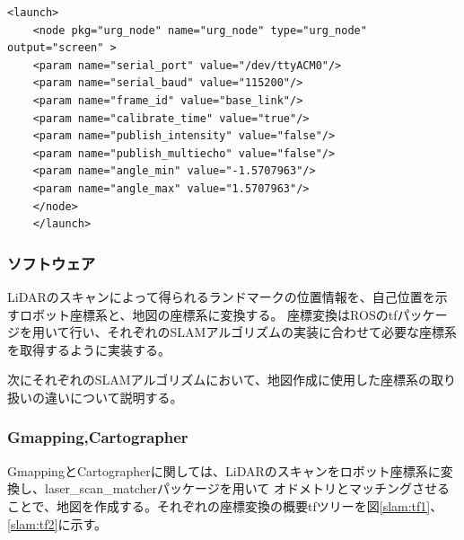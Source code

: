 \begin{lrbox}{\mybox}
  \begin{lstlisting}[caption=LiDARによる点群取得の実行ファイル,label=slam:s1]
    <launch>
    <node pkg="urg_node" name="urg_node" type="urg_node" output="screen" >
    <param name="serial_port" value="/dev/ttyACM0"/>
    <param name="serial_baud" value="115200"/>
    <param name="frame_id" value="base_link"/>
    <param name="calibrate_time" value="true"/>
    <param name="publish_intensity" value="false"/>
    <param name="publish_multiecho" value="false"/>
    <param name="angle_min" value="-1.5707963"/>
    <param name="angle_max" value="1.5707963"/>
    </node>
    </launch>
  \end{lstlisting}
\end{lrbox}
\scalebox{.9}{\usebox{\mybox}}

\subsubsection{ソフトウェア}
LiDARのスキャンによって得られるランドマークの位置情報を、自己位置を示すロボット座標系と、地図の座標系に変換する。
座標変換はROSのtf\cite{slam:tf}パッケージを用いて行い、それぞれのSLAMアルゴリズムの実装に合わせて必要な座標系を取得するように実装する。

次にそれぞれのSLAMアルゴリズムにおいて、地図作成に使用した座標系の取り扱いの違いについて説明する。

\subsubsection{Gmapping,Cartographer}
GmappingとCartographerに関しては、LiDARのスキャンをロボット座標系に変換し、laser_scan_matcher\cite{slam:laser}パッケージを用いて
オドメトリとマッチングさせることで、地図を作成する。それぞれの座標変換の概要tfツリーを図\ref{slam:tf1}、\ref{slam:tf2}に示す。

